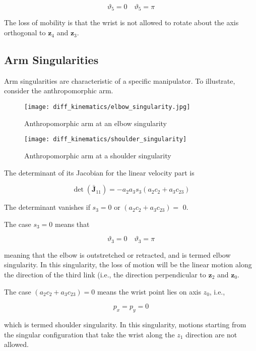 \documentclass[10pt]{article}
\begin{document}
$$
\vartheta_{5}=0 \quad \vartheta_{5}=\pi
$$

The loss of mobility is  that the wrist is not allowed to rotate about the axis orthogonal to $\boldsymbol{z}_{4}$ and $\boldsymbol{z}_{3}$. 

\subsection{Arm Singularities}
Arm singularities are characteristic of a specific manipulator. To illustrate, consider the anthropomorphic arm.

\begin{figure}[H]
    \centering
    \texttt{[image: diff\_kinematics/elbow\_singularity.jpg]}
    \caption{Anthropomorphic arm at an elbow singularity}
    \label{fig:enter-label}
\end{figure}


\begin{figure}[H]
    \centering
    \texttt{[image: diff\_kinematics/shoulder\_singularity]}
    \caption{ Anthropomorphic arm at a shoulder singularity}
    \label{fig:enter-label}
\end{figure}



 

The determinant of its Jacobian for the linear velocity part is 

$$
\operatorname{det}\left(\boldsymbol{\bar{J}}_{11}\right)=-a_{2} a_{3}  s_{3}\left(a_{2} c_{2}+a_{3} c_{23}\right)
$$


The determinant vanishes if $s_{3}=0$ or $\left(a_{2} c_{2}+a_{3} c_{23}\right)=$ 0. 


The case $s_{3}=0$ means that 

$$
\vartheta_{3}=0 \quad \vartheta_{3}=\pi
$$

meaning that the elbow is outstretched or retracted, and is termed elbow singularity. In this singularity, the loss of motion will be the linear motion along the direction of the third link (i.e., the direction perpendicular to $\boldsymbol{z}_2$ and $\boldsymbol{z}_0$.

The case $\left(a_{2} c_{2}+a_{3} c_{23}\right)=0$  means the wrist point lies on axis $z_{0}$, i.e., 

$$
p_{x}=p_{y}=0
$$

which is termed shoulder singularity. In this singularity, motions starting from the singular configuration that take the wrist along the $z_{1}$ direction are not allowed.
\end{document}
